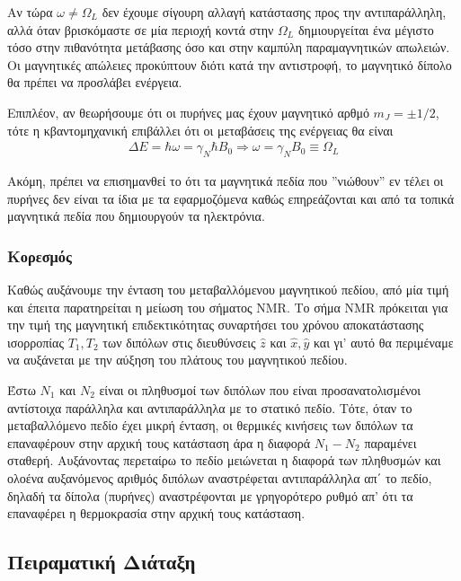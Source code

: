 \documentclass[a4paper]{article}
\begin{document}
	Αν τώρα $\omega\neq\Omega_L$ δεν έχουμε σίγουρη αλλαγή κατάστασης προς την αντιπαράλληλη, αλλά όταν βρισκόμαστε σε μία περιοχή κοντά στην $\Omega_L$ δημιουργείται ένα μέγιστο τόσο στην πιθανότητα μετάβασης όσο και στην καμπύλη παραμαγνητικών απωλειών. Οι μαγνητικές απώλειες προκύπτουν διότι κατά την αντιστροφή, το μαγνητικό δίπολο θα πρέπει να προσλάβει ενέργεια.
	
	Επιπλέον, αν θεωρήσουμε ότι οι πυρήνες μας έχουν μαγνητικό αρθμό $m_J=\pm1/2$, τότε η κβαντομηχανική επιβάλλει ότι οι μεταβάσεις της ενέργειας θα είναι 
	\begin{align}\label{5}
		\Delta E = \hbar\omega =\gamma_N\hbar B_0 \Rightarrow \omega = \gamma_N B_0 \equiv\Omega_L
	\end{align}


Ακόμη, πρέπει να επισημανθεί το ότι τα μαγνητικά πεδία που ''νιώθουν'' εν τέλει οι πυρήνες δεν είναι τα ίδια με τα εφαρμοζόμενα καθώς επηρεάζονται και από τα τοπικά μαγνητικά πεδία που δημιουργούν τα ηλεκτρόνια.
	\vspace{-0.3cm}
	\subsubsection*{Κορεσμός}
Καθώς αυξάνουμε την ένταση του μεταβαλλόμενου μαγνητικού πεδίου, από μία τιμή και έπειτα παρατηρείται η μείωση του σήματος NMR. Το σήμα NMR πρόκειται για την τιμή της μαγνητική επιδεκτικότητας συναρτήσει του χρόνου αποκατάστασης ισορροπίας $T_1,T_2$ των διπόλων στις διευθύνσεις $\hat{z}$ και $\hat{x},\hat{y}$ και γι' αυτό θα περιμέναμε να αυξάνεται με την αύξηση του πλάτους του μαγνητικού πεδίου.
	
	Έστω $N_1$ και $N_2$ είναι οι πληθυσμοί των διπόλων που είναι προσανατολισμένοι αντίστοιχα παράλληλα και αντιπαράλληλα με το στατικό πεδίο. Τότε, όταν το μεταβαλλόμενο πεδίο έχει μικρή ένταση, οι θερμικές κινήσεις των διπόλων τα επαναφέρουν στην αρχική τους κατάσταση άρα η διαφορά $N_1-N_2$ παραμένει σταθερή.  Αυξάνοντας περεταίρω το πεδίο μειώνεται η διαφορά των πληθυσμών και ολοένα αυξανόμενος αριθμός διπόλων αναστρέφεται αντιπαράλληλα απ΄ το πεδίο, δηλαδή τα δίπολα (πυρήνες) αναστρέφονται με γρηγορότερο ρυθμό απ' ότι τα επαναφέρει η θερμοκρασία στην αρχική τους κατάσταση.
	\vspace{-0.3cm}
\subsection*{Πειραματική Διάταξη}
\end{document}
